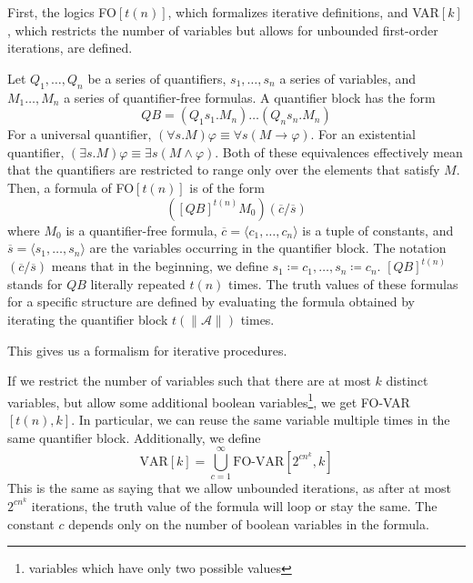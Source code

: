 First, the logics FO$[t(n)]$, which formalizes iterative definitions, and VAR$[k]$, which restricts the number of variables but allows for unbounded first-order iterations, are defined.

\begin{define}[{FO$[t(n)]$}]
    Let $Q_1, \dots, Q_n$ be a series of quantifiers, $s_1, \dots, s_n$ a series of variables, and $M_1 \dots, M_n$ a series of quantifier-free formulas.
    A quantifier block has the form \[QB = (Q_{1}s_{1}.M_{n})\dots(Q_{n}s_{n}.M_{n})\]
    For a universal quantifier, $(\forall s.M)\varphi \equiv \forall s (M \to \varphi)$.
    For an existential quantifier, $(\exists s.M)\varphi \equiv \exists s(M \land \varphi)$.
    Both of these equivalences effectively mean that the quantifiers are restricted to range only over the elements that satisfy $M$.
    Then, a formula of FO$[t(n)]$ is of the form
    \[
        \left([QB]^{t(n)}M_{0}\right)(\overline{c} / \overline{s})
    \]
    where $M_0$ is a quantifier-free formula, $\overline{c} = \langle c_1, \dots, c_n \rangle$ is a tuple of constants, and $\overline{s} = \langle s_1, \dots, s_n \rangle$ are the variables occurring in the quantifier block.
    The notation $(\overline{c} / \overline{s})$ means that in the beginning, we define $s_1 \coloneqq c_1, \dots, s_n \coloneqq c_n$.
    $[QB]^{t(n)}$ stands for $QB$ literally repeated $t(n)$ times.
    The truth values of these formulas for a specific structure are defined by evaluating the formula obtained by iterating the quantifier block $t(\lVert \mathcal{A}\rVert)$ times.
\end{define}
This gives us a formalism for iterative procedures.

If we restrict the number of variables such that there are at most $k$ distinct variables, but allow some additional boolean variables\footnote{variables which have only two possible values}, we get FO-VAR$[t(n), k]$.
In particular, we can reuse the same variable multiple times in the same quantifier block.
Additionally, we define
\[
    \text{VAR}[k] = \bigcup_{c = 1}^{\infty}\text{FO-VAR}[2^{cn^k}, k]
\]
This is the same as saying that we allow unbounded iterations, as after at most $2^{cn^k}$ iterations, the truth value of the formula will loop or stay the same.
The constant $c$ depends only on the number of boolean variables in the formula.

